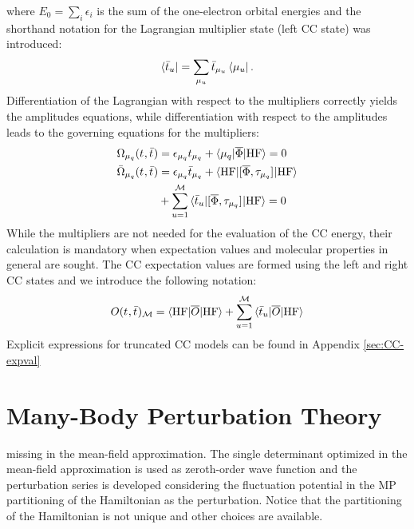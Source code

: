 where $E_0 = \sum_{i}\epsilon_i$ is the sum of the one-electron orbital
energies and the shorthand notation for the Lagrangian multiplier state (left
\acrshort{CC} state) was introduced:
\begin{equation}
  \label{eq:left-state}
  \bra{\bar{t}_{u}} = \sum_{\mu_u}\bar{t}_{\mu_u}\bra{\mu_u}.
\end{equation}
Differentiation of the Lagrangian with respect to the multipliers
correctly yields the amplitudes equations, while differentiation with
respect to the amplitudes leads to the governing equations for the
multipliers:
\begin{subequations}
  \begin{align}
   \Omega_{\mu_q}(t_{}, \bar{t}_{})  &=
   \epsilon_{\mu_q}t_{\mu_q} + \braket{\mu_q | \overline{\Phi} | \mathrm{HF}}
             = 0 \label{eq:cc-amplitudes}\\
   \bar{\Omega}_{\mu_q}(t_{}, \bar{t}_{})
    &=
    \epsilon_{\mu_q}\bar{t}_{\mu_q} +
    \braket{\mathrm{HF} | [ \overline{\Phi}, \tau_{\mu_q} ]^{}
    | \mathrm{HF}}  \nonumber \\
    &+
    \sum_{u=1}^{\mathcal{M}}\braket{\bar{t}_{u} |
    [ \overline{\Phi}, \tau_{\mu_q} ]^{} | \mathrm{HF}}
             = 0 \label{eq:cc-multipliers}
  \end{align}
\end{subequations}
While the multipliers are not needed for the evaluation of the
\acrshort{CC} energy, their calculation is mandatory when expectation values
and molecular properties in general are sought.
The \acrshort{CC} expectation values are formed using the left and
right \acrshort{CC} states and we introduce the following notation:
\begin{equation}\label{eq:cc-expectation-value}
  O(t_{}, \bar{t}_{})_\mathcal{M} = \braket{\mathrm{HF} | \overline{O} | \mathrm{HF} }
  + \sum_{u=1}^{\mathcal{M}}\braket{\bar{t}_{u} | \overline{O} | \mathrm{HF} }
\end{equation}
Explicit expressions for truncated \acrshort{CC} models can be found in
Appendix \ref{sec:CC-expval}

\section{Many-Body Perturbation Theory}\label{sec:mbpt}

 missing in the
mean-field approximation.\autocite{Konishi2009-zb}
The single determinant optimized in the mean-field approximation is used
as zeroth-order wave function and the perturbation series is developed
considering the fluctuation potential in the \acrlong{MP} partitioning
of the Hamiltonian as the perturbation.\autocite{McWeeny1992-oj, Helgaker2000-tz}
Notice that the partitioning of the Hamiltonian is not unique and
other choices are available.\autocite{Shavitt2009-mr}

